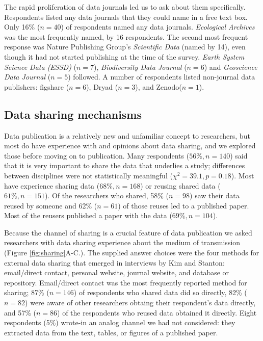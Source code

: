 \documentclass[10pt]{article}
\begin{document}
The rapid proliferation of data journals led us to ask about them specifically.
Respondents listed any data journals that they could name in a free text box.
Only 16\% ($n=40$) of respondents named any data journals. 
\emph{Ecological Archives} was the most frequently named, by 16 respondents. 
The second most frequent response was Nature Publishing Group's \emph{Scientific Data} (named by 14), even though it had not started publishing at the time of the survey.
\emph{Earth System Science Data (ESSD)} ($n=7$), \emph{Biodiversity Data Journal} ($n=6$) and \emph{Geoscience Data Journal} ($n=5$) followed.
A number of respondents listed non-journal data publishers: figshare ($n=6$), Dryad ($n=3$), and Zenodo($n=1$).

\subsection*{Data sharing mechanisms}

Data publication is a relatively new and unfamiliar concept to researchers, but most do have experience with and opinions about data sharing, and we explored those before moving on to publication.
Many respondents ($56\%, n=140$) said that it is very important to share the data that underlies a study; differences between disciplines were not statistically meaningful ($\chi^{2}= 39.1, p= 0.18$). %
Most have experience sharing data ($68\%, n=168$) or reusing shared data ($61\%, n=151$).
Of the researchers who shared, 58\% ($n=98$) saw their data reused by someone and 62\% ($n=61$) of those reuses led to a published paper.
Most of the reusers published a paper with the data ($69\%, n=104$).

Because the channel of sharing is a crucial feature of data publication\cite{kratz_data_2014} we asked researchers with data sharing experience about the medium of transmission (Figure \ref{fig:sharing}A-C.).
The supplied answer choices were the four methods for external data sharing that emerged in interviews by Kim and Stanton: email/direct contact, personal website, journal website, and database or repository\cite{kim_institutional_2012}.
Email/direct contact was the most frequently reported method for sharing; 87\% ($n=146$) of respondents who shared data did so directly, 82\% ($n=82$) were aware of other researchers obtaing their respondent's data directly, and 57\% ($n=86$) of the respondents who reused data obtained it directly.
Eight respondents (5\%) wrote-in an analog channel we had not considered: they extracted data from the text, tables, or figures of a published paper.
\end{document}
